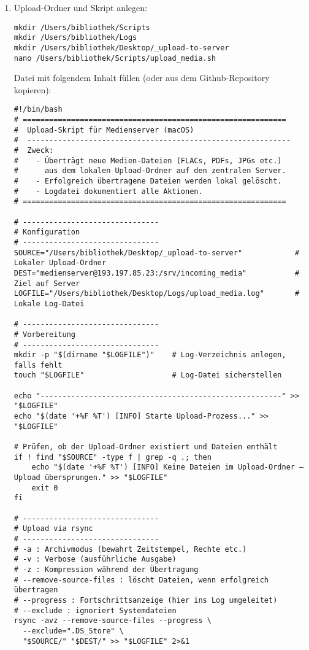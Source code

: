 \documentclass[12pt,a4paper]{report}
\begin{document}
  \begin{enumerate}
    \item Upload-Ordner und Skript anlegen:
    \begin{verbatim}
mkdir /Users/bibliothek/Scripts
mkdir /Users/bibliothek/Logs
mkdir /Users/bibliothek/Desktop/_upload-to-server
nano /Users/bibliothek/Scripts/upload_media.sh
    \end{verbatim}

    Datei mit folgendem Inhalt füllen (oder aus dem Github-Repository kopieren):

    \begin{verbatim}
#!/bin/bash
# ============================================================
#  Upload-Skript für Medienserver (macOS)
#  ------------------------------------------------------------
#  Zweck:
#    - Überträgt neue Medien-Dateien (FLACs, PDFs, JPGs etc.)
#      aus dem lokalen Upload-Ordner auf den zentralen Server.
#    - Erfolgreich übertragene Dateien werden lokal gelöscht.
#    - Logdatei dokumentiert alle Aktionen.
# ============================================================

# -------------------------------
# Konfiguration
# -------------------------------
SOURCE="/Users/bibliothek/Desktop/_upload-to-server"            # Lokaler Upload-Ordner
DEST="medienserver@193.197.85.23:/srv/incoming_media"           # Ziel auf Server
LOGFILE="/Users/bibliothek/Desktop/Logs/upload_media.log"       # Lokale Log-Datei

# -------------------------------
# Vorbereitung
# -------------------------------
mkdir -p "$(dirname "$LOGFILE")"    # Log-Verzeichnis anlegen, falls fehlt
touch "$LOGFILE"                    # Log-Datei sicherstellen

echo "-------------------------------------------------------" >> "$LOGFILE"
echo "$(date '+%F %T') [INFO] Starte Upload-Prozess..." >> "$LOGFILE"

# Prüfen, ob der Upload-Ordner existiert und Dateien enthält
if ! find "$SOURCE" -type f | grep -q .; then
    echo "$(date '+%F %T') [INFO] Keine Dateien im Upload-Ordner – Upload übersprungen." >> "$LOGFILE"
    exit 0
fi

# -------------------------------
# Upload via rsync
# -------------------------------
# -a : Archivmodus (bewahrt Zeitstempel, Rechte etc.)
# -v : Verbose (ausführliche Ausgabe)
# -z : Kompression während der Übertragung
# --remove-source-files : löscht Dateien, wenn erfolgreich übertragen
# --progress : Fortschrittsanzeige (hier ins Log umgeleitet)
# --exclude : ignoriert Systemdateien
rsync -avz --remove-source-files --progress \
  --exclude=".DS_Store" \
  "$SOURCE/" "$DEST/" >> "$LOGFILE" 2>&1


\end{verbatim}
\end{enumerate}
\end{document}
